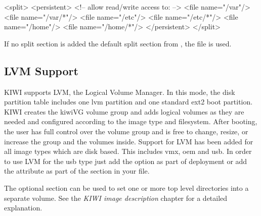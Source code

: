 \begin{xml}
<split>
   <persistent>
      <!-- allow read/write access to: -->
      <file name="/var"/>
      <file name="/var/*"/>
      <file name="/etc"/>
      <file name="/etc/*"/>
      <file name="/home"/>
      <file name="/home/*"/>
   </persistent>
</split>
\end{xml}

If no split section is added the default split section from
, the file  is used.

\subsection{LVM Support}
KIWI supports LVM, the Logical Volume Manager. In this
mode, the disk partition table includes one lvm partition and one
standard ext2 boot partition. KIWI creates the kiwiVG volume group and
adds logical volumes as they are needed and configured according to the
image type and filesystem. After booting, the user has full
control over the volume group and is free to change, resize, or increase the
group and the volumes inside. Support for LVM has been added for all
image types which are disk based. This includes vmx, oem and usb.
In order to use LVM for the usb type just add the  option
as part of   deployment or add the
attribute  as part of the  section
in your  file.

The optional  section can be used to set one or
more top level directories into a separate volume. See the
\textit{KIWI image description} chapter for a detailed explanation.

